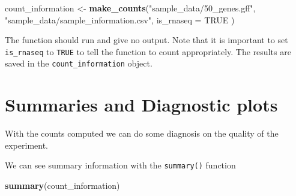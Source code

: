 \documentclass[]{book}
\newenvironment{Shaded}{\begin{snugshade}}{\end{snugshade}}
\newcommand{\DataTypeTok}[1]{\textcolor[rgb]{0.13,0.29,0.53}{#1}}
\newcommand{\KeywordTok}[1]{\textcolor[rgb]{0.13,0.29,0.53}{\textbf{#1}}}
\newcommand{\NormalTok}[1]{#1}
\newcommand{\OtherTok}[1]{\textcolor[rgb]{0.56,0.35,0.01}{#1}}
\newcommand{\StringTok}[1]{\textcolor[rgb]{0.31,0.60,0.02}{#1}}
\begin{document}
\begin{Shaded}
\begin{Highlighting}[]
\NormalTok{count_information <-}\StringTok{ }\KeywordTok{make_counts}\NormalTok{(}\StringTok{"sample_data/50_genes.gff"}\NormalTok{,}
                                 \StringTok{"sample_data/sample_information.csv"}\NormalTok{,}
                                 \DataTypeTok{is_rnaseq =} \OtherTok{TRUE}
\NormalTok{                                 )}
\end{Highlighting}
\end{Shaded}

The function should run and give no output. Note that it is important to set \texttt{is\_rnaseq} to \texttt{TRUE} to tell the function to count appropriately. The results are saved in the \texttt{count\_information} object.

\hypertarget{summaries-and-diagnostic-plots}{%
\section{Summaries and Diagnostic plots}\label{summaries-and-diagnostic-plots}}

With the counts computed we can do some diagnosis on the quality of the experiment.

We can see summary information with the \texttt{summary()} function

\begin{Shaded}
\begin{Highlighting}[]
\KeywordTok{summary}\NormalTok{(count_information)}
\end{Highlighting}
\end{Shaded}
\end{document}
